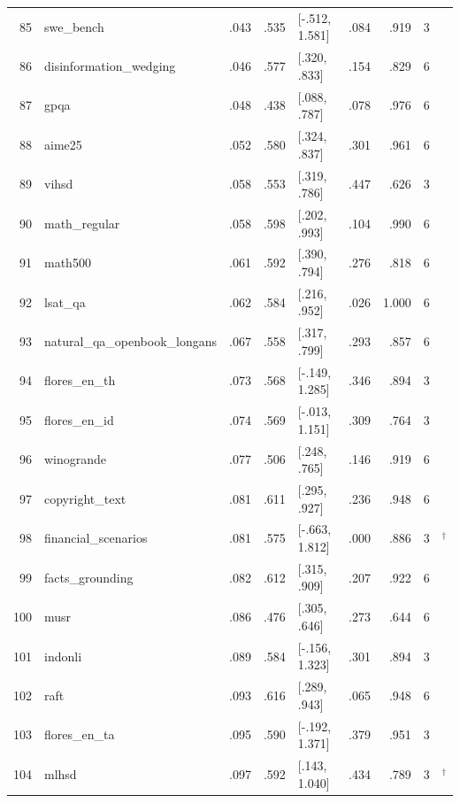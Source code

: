 \begin{longtable}{@{}r>{\raggedright\arraybackslash}p{}rrlrrr>{\raggedright\arraybackslash}p{}@{}}
85 & swe\_bench & .043 & .535 & [-.512, 1.581] & .084 & .919 & 3 & \citealp{jimenez2023swe} \\
86 & disinformation\_wedging & .046 & .577 & [.320, .833] & .154 & .829 & 6 & \citealp{helm2023} \\
87 & gpqa & .048 & .438 & [.088, .787] & .078 & .976 & 6 & \citealp{rein2023gpqa} \\
88 & aime25 & .052 & .580 & [.324, .837] & .301 & .961 & 6 & \citealp{maa_aime} \\
89 & vihsd & .058 & .553 & [.319, .786] & .447 & .626 & 3 & \citealp{luu2021large} \\
90 & math\_regular & .058 & .598 & [.202, .993] & .104 & .990 & 6 & \citealp{hendrycks2021measuring} \\
91 & math500 & .061 & .592 & [.390, .794] & .276 & .818 & 6 & \citealp{lightman2023let} \\
92 & lsat\_qa & .062 & .584 & [.216, .952] & .026 & 1.000 & 6 & \citealp{zhong2021ar} \\
93 & natural\_qa\_openbook\_longans & .067 & .558 & [.317, .799] & .293 & .857 & 6 & \citealp{kwiatkowski2019natural} \\
94 & flores\_en\_th & .073 & .568 & [-.149, 1.285] & .346 & .894 & 3 & \citealp{costajussa2022no} \\
95 & flores\_en\_id & .074 & .569 & [-.013, 1.151] & .309 & .764 & 3 & \citealp{costajussa2022no} \\
96 & winogrande & .077 & .506 & [.248, .765] & .146 & .919 & 6 & \citealp{sakaguchi2019winogrande} \\
97 & copyright\_text & .081 & .611 & [.295, .927] & .236 & .948 & 6 & \citealp{helm2023} \\
98 & financial\_scenarios & .081 & .575 & [-.663, 1.812] & .000 & .886 & 3 & \citealp{helm2023}$^\dagger$ \\
99 & facts\_grounding & .082 & .612 & [.315, .909] & .207 & .922 & 6 & \citealp{cheng2025facts} \\
100 & musr & .086 & .476 & [.305, .646] & .273 & .644 & 6 & \citealp{sprague2023musr} \\
101 & indonli & .089 & .584 & [-.156, 1.323] & .301 & .894 & 3 & \citealp{mahendra2021indonli} \\
102 & raft & .093 & .616 & [.289, .943] & .065 & .948 & 6 & \citealp{alex2021raft} \\
103 & flores\_en\_ta & .095 & .590 & [-.192, 1.371] & .379 & .951 & 3 & \citealp{costajussa2022no} \\
104 & mlhsd & .097 & .592 & [.143, 1.040] & .434 & .789 & 3 & \citealp{susanto2025sea}$^\dagger$ \\

\end{longtable}
